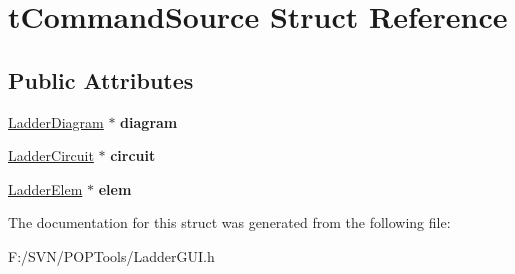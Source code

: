 \hypertarget{structt_command_source}{\section{t\-Command\-Source Struct Reference}
\label{structt_command_source}
}
\subsection*{Public Attributes}
\begin{DoxyCompactItemize}
\item 
\hypertarget{structt_command_source_a335e2b480fb4978949f9d39ed437b752}{\hyperlink{class_ladder_diagram}{Ladder\-Diagram} $\ast$ {\bfseries diagram}}\label{structt_command_source_a335e2b480fb4978949f9d39ed437b752}

\item 
\hypertarget{structt_command_source_a78199af7eba9e684190fbe14be975fcc}{\hyperlink{class_ladder_circuit}{Ladder\-Circuit} $\ast$ {\bfseries circuit}}\label{structt_command_source_a78199af7eba9e684190fbe14be975fcc}

\item 
\hypertarget{structt_command_source_ab3a4d7985bfc5edb8b9fa2a3e39f83c7}{\hyperlink{class_ladder_elem}{Ladder\-Elem} $\ast$ {\bfseries elem}}\label{structt_command_source_ab3a4d7985bfc5edb8b9fa2a3e39f83c7}

\end{DoxyCompactItemize}


The documentation for this struct was generated from the following file\-:\begin{DoxyCompactItemize}
\item 
F\-:/\-S\-V\-N/\-P\-O\-P\-Tools/Ladder\-G\-U\-I.\-h\end{DoxyCompactItemize}
